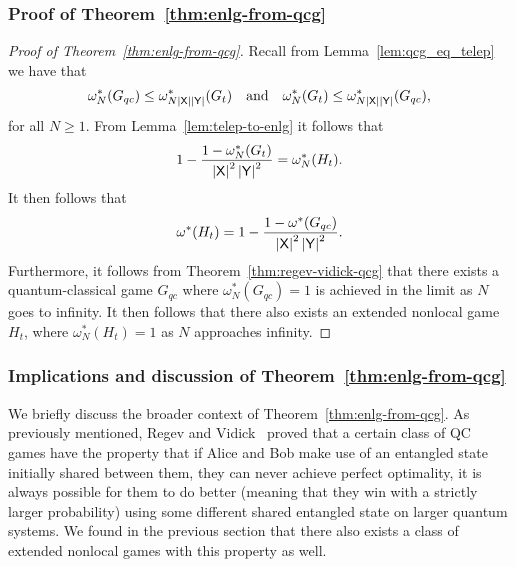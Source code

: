 \subsubsection*{Proof of Theorem~\ref{thm:enlg-from-qcg}}

\begin{proof}[Proof of Theorem~\ref{thm:enlg-from-qcg}]
	Recall from Lemma~\ref{lem:qcg_eq_telep} we have that 
	\begin{align}
		\omega_N^*(G_{qc}) \leq \omega_{N\left\lvert \mathsf{X} \right\rvert\left\lvert \mathsf{Y} \right\rvert}^*(G_t) \quad \textnormal{and} \quad \omega^*_{N}(G_t) \leq \omega^*_{N\left\lvert \mathsf{X} \right\rvert\left\lvert \mathsf{Y} \right\rvert}(G_{qc}),
	\end{align}		
	for all $N \geq 1$. From Lemma~\ref{lem:telep-to-enlg} it follows that 
	\begin{align}
		1 - \frac{1 - \omega_{N}^*(G_t)}{\left\lvert \mathsf{X} \right\rvert^2\left\lvert \mathsf{Y} \right\rvert^2} = \omega_N^*(H_t).
	\end{align}
	It then follows that 
	\begin{align}
		\omega^*(H_t) = 1 - \frac{1-\omega^*(G_{qc})}{\left\lvert \mathsf{X} \right\rvert^2\left\lvert \mathsf{Y} \right\rvert^2}.
	\end{align}
	Furthermore, it follows from Theorem~\ref{thm:regev-vidick-qcg} that there exists a quantum-classical game $G_{qc}$ where $\omega_N^*(G_{qc}) = 1$ is achieved in the limit as $N$ goes to infinity. It then follows that there also exists an extended nonlocal game $H_t$, where $\omega_N^*(H_t) = 1$ as $N$ approaches infinity. 
\end{proof}

\subsubsection*{Implications and discussion of Theorem~\ref{thm:enlg-from-qcg}}

We briefly discuss the broader context of Theorem~\ref{thm:enlg-from-qcg}. As previously mentioned, Regev and Vidick~\cite{Regev2013} proved that a certain class of QC games have the property that if Alice and Bob make use of an entangled state initially shared between them, they can never achieve perfect optimality, it is always possible for them to do better (meaning that they win with a strictly larger probability) using some different shared entangled state on larger quantum systems. We found in the previous section that there also exists a class of extended nonlocal games with this property as well. 
 

